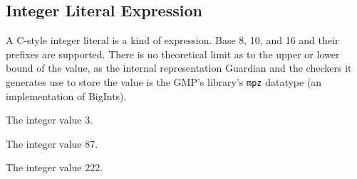 
\subsection{Integer Literal Expression}
{
	A C-style integer literal is a kind of expression.
	Base 8, 10, and 16 and their prefixes are supported.
	There is no theoretical limit as to the upper or lower bound of the value,
	as the internal representation Guardian and the checkers it generates
	use to store the value
	is the GMP's library's \texttt{mpz} datatype (an implementation of BigInts).
	
	\begin{itemize}
	{
		\item[\texttt{3}] The integer value 3.
		
		\item[\texttt{0127}] The integer value 87.
		
		\item[\texttt{0xDE}] The integer value 222.
	}
	\end{itemize}
}
